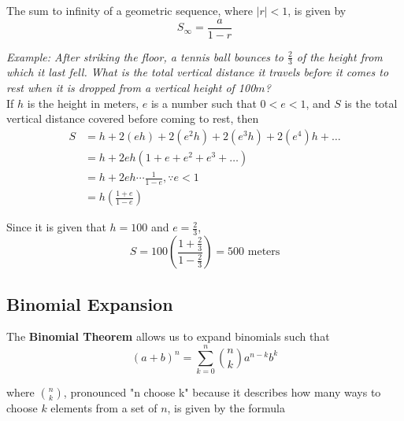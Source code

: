         \noindent The sum to infinity of a geometric sequence, where $|r|<1$, is given by \\

        \begin{equation*}
            S_\infty=\frac{a}{1-r}
        \end{equation*}

        \noindent \color{blue} \textit{Example: After striking the floor, a tennis ball bounces
        to $\frac{2}{3}$ of the height from which it last fell. What is the total vertical
        distance it travels before it comes to rest when it is dropped from a vertical height of
        100$m$?} \color{black} \\

        \noindent If $h$ is the height in meters, $e$ is a number such that $0<e<1$, and $S$ is
        the total vertical distance covered before coming to rest, then \\

        \begin{align*}
            S &= h+2(eh)+2(e^2h)+2(e^3h)+2(e^4)h + \dots \\
            &= h+2eh(1+e+e^2+e^3+\dots) \\
            &= h+2eh \cdots \frac{1}{1-e}, \because e<1 \\
            &= h\left(\frac{1+e}{1-e}\right)
        \end{align*}

        \noindent Since it is given that $h=100$ and $e=\frac{2}{3}$, \\

        \begin{equation*}
            S=100\left(\frac{1+\frac{2}{3}}{1-\frac{2}{3}}\right)=500 \text{ meters}
        \end{equation*}



    \subsection{Binomial Expansion}
        The \textbf{Binomial Theorem} allows us to expand binomials such that \\

        \begin{equation*}
            (a+b)^n
            = \sum^n_{k=0}\binom{n}{k}a^{n-k}b^k
        \end{equation*}

        \noindent where $\binom{n}{k}$, pronounced "n choose k" because it describes how many
        ways to choose $k$ elements from a set of $n$, is given by the formula \\

